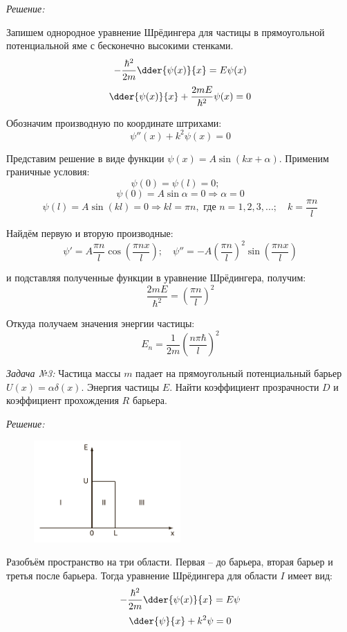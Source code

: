 \emph{Решение:}

Запишем однородное уравнение Шрёдингера для частицы в 
прямоугольной потенциальной яме с бесконечно высокими стенками.
\[
	-\frac{\hbar^2}{2m}\dder{\psi(x)}{x} = E\psi(x)
\] 
\[
	\dder{\psi(x)}{x}+\frac{2mE}{\hbar^2}\psi(x) = 0
\]

Обозначим производную по координате штрихами:
\[
	\psi''(x) + k^2 \psi(x) = 0
\]

Представим решение в виде функции 
\( \psi(x) = A\sin\left( kx + \alpha \right) \). Применим 
граничные условия:
\[
	\psi(0) = \psi(l) = 0; \quad
\]
\[
	\psi(0) = A\sin\alpha = 0 \Rightarrow \alpha = 0
\]
\[
	\psi(l) = A\sin\left( kl \right) = 0 \Rightarrow kl = \pi n, 
	\text{ где } n = 1, 2, 3, ...; \quad k = \frac{\pi n}{l}
\]

Найдём первую и вторую производные:
\[
	\psi' = A\frac{\pi n}{l}\cos\left( \frac{\pi nx}{l} \right);\quad
	\psi'' = -A\left(\frac{\pi n}{l} \right)^2 
		\sin\left( \frac{\pi nx}{l} \right)
\]

и подставляя полученные функции в уравнение Шрёдингера, получим:
\[
	\frac{2mE}{\hbar^2} = \left( \frac{\pi n}{l} \right)^2
\]

Откуда получаем значения энергии частицы:
\[
	E_n = \frac{1}{2m}\left( \frac{n\pi\hbar}{l} \right)^2
\]

\pagebreak

\emph{Задача №3:} Частица массы \( m \) падает на прямоугольный потенциальный 
барьер \( U(x) = \alpha\delta(x) \). Энергия частицы \( E \). Найти коэффициент 
прозрачности \( D \) и коэффициент прохождения \( R \) барьера.

\emph{Решение:}

\begin{figure}
    \vspace{-2ex}
    \includegraphics[width=0.5\textwidth]{images/wall}
\end{figure}

Разобъём пространство на три области. Первая -- до барьера, вторая 
барьер и третья после барьера. Тогда уравнение Шрёдингера для 
области \( I \) имеет вид:
\[
	-\frac{\hbar^2}{2m}\dder{\psi(x)}{x} = E\psi
\]
\[
	\dder{\psi}{x} + k^2 \psi = 0
\]

